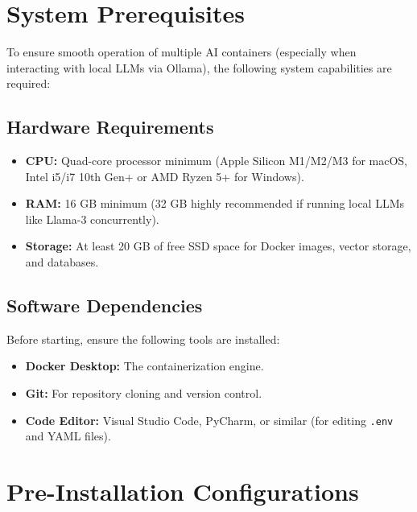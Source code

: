 \documentclass[12pt,a4paper]{article}
\begin{document}
\section{System Prerequisites}
To ensure smooth operation of multiple AI containers (especially when interacting with local LLMs via Ollama), the following system capabilities are required:

\subsection{Hardware Requirements}
\begin{itemize}
    \item \textbf{CPU:} Quad-core processor minimum (Apple Silicon M1/M2/M3 for macOS, Intel i5/i7 10th Gen+ or AMD Ryzen 5+ for Windows).
    \item \textbf{RAM:} 16 GB minimum (32 GB highly recommended if running local LLMs like Llama-3 concurrently).
    \item \textbf{Storage:} At least 20 GB of free SSD space for Docker images, vector storage, and databases.
\end{itemize}

\subsection{Software Dependencies}
Before starting, ensure the following tools are installed:
\begin{itemize}
    \item \textbf{Docker Desktop:} The containerization engine.
    \item \textbf{Git:} For repository cloning and version control.
    \item \textbf{Code Editor:} Visual Studio Code, PyCharm, or similar (for editing \texttt{.env} and YAML files).
\end{itemize}

\section{Pre-Installation Configurations}
\end{document}
